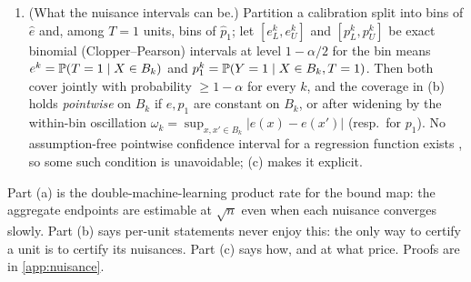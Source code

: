 \begin{theorem}
\begin{enumerate}
that is monotone in the box --- the endpoints of \cref{thm:sharp-auc}, the
certificate $\Rbar_\Gamma$, the regret of \cref{prop:regret} --- is
conservative when evaluated on $\I^\circ$.
\item[(c)] \textup{(What the nuisance intervals can be.)} Partition a
calibration split into bins of $\hat e$ and, among $T=1$ units, bins of
$\hat p_1$; let $[e_L^k,e_U^k]$ and $[p_L^k,p_U^k]$ be exact binomial
(Clopper--Pearson) intervals at level $1-\alpha/2$ for the bin means
$e^k=\mathbb{P}(T=1\mid X\in B_k)$ and $p_1^k=\mathbb{P}(Y=1\mid X\in B_k,T=1)$. Then
both cover jointly with probability $\ge1-\alpha$ for every $k$, and the
coverage in (b) holds \emph{pointwise} on $B_k$ if $e,p_1$ are constant on
$B_k$, or after widening by the within-bin oscillation
$\omega_k=\sup_{x,x'\in B_k}|e(x)-e(x')|$ (resp.\ for $p_1$). No
assumption-free pointwise confidence interval for a regression function exists
\citep{low1997nonparametric}, so some such condition is unavoidable; (c) makes
it explicit.
\end{enumerate}
\end{theorem}

Part (a) is the double-machine-learning product rate
\citep{chernozhukov2018double} for the bound map: the aggregate endpoints are
estimable at $\sqrt n$ even when each nuisance converges slowly. Part (b)
says per-unit statements never enjoy this: the only way to certify a unit is
to certify its nuisances. Part (c) says how, and at what price. Proofs are in
\cref{app:nuisance}.

